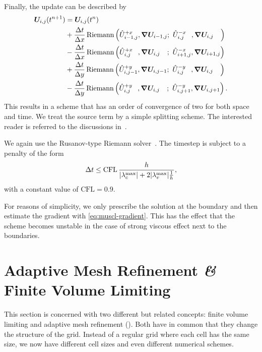 Finally, the update can be described by
\begin{align}
  \begin{split}
    \cellAvg (t^{n+1}) &= \cellAvg (t^n)
    \\ &+
  \frac{\Delta t}{\Delta x}
    \Riemann \left(
      \evolvedCellAvg[i-1,j]{+x}, \gradCellAvg[i-1,j]; \ %
      \evolvedCellAvg[i,j\phantom{-1}]{-x}, \gradCellAvg[i,j\phantom{-1}]
    \right)
    \\ &-
  \frac{\Delta t}{\Delta x}
    \Riemann \left(
      \evolvedCellAvg[i,j\phantom{+1}]{+x}, \gradCellAvg[i,j\phantom{+1}]; \ %
      \evolvedCellAvg[i+1,j]{-x}, \gradCellAvg[i+1,j]
    \right)
    \\ &+
  \frac{\Delta t}{\Delta y}
    \Riemann \left(
      \evolvedCellAvg[i,j-1]{+y}, \gradCellAvg[i,j-1]; \ %
      \evolvedCellAvg[i,j\phantom{-1}]{-y}, \gradCellAvg[i,j\phantom{-1}]
    \right)
    \\ &-
  \frac{\Delta t}{\Delta y}
    \Riemann \left(
      \evolvedCellAvg[i,j\phantom{+1}]{+y}, \gradCellAvg[i,j\phantom{+1}]; \ %
      \evolvedCellAvg[i,j+1]{-y}, \gradCellAvg[i,j+1]
    \right).
  \end{split}
\end{align}
This results in a scheme that has an order of convergence of two for both space and time.
We treat the source term by a simple splitting scheme.
The interested reader is referred to the discussions in~\cite{leVeque2002finite,toro2009riemann}.

We again use the Rusanov-type Riemann solver~.
The timestep is subject to a penalty of the form
\begin{equation}\label{eq:cfl-muscl}
 \Delta t \leq  \text{CFL} \, \frac{h}{\maxConvEigen + 2 \maxViscEigen \frac{1}{h}},
\end{equation}
with a constant value of $\text{CFL} = 0.9$.

For reasons of simplicity, we only prescribe the solution at the boundary and then estimate the gradient with \cref{eq:muscl-gradient}.
This has the effect that the scheme becomes unstable in the case of strong viscous effect next to the boundaries.

\section{Adaptive Mesh Refinement \textit{\&} Finite Volume Limiting}\label{sec:grid}
This section is concerned with two different but related concepts:
finite volume limiting and adaptive mesh refinement (\amr{}).
Both have in common that they change the structure of the grid.
Instead of a regular grid where each cell has the same size, we now have different cell sizes and even different numerical schemes.


